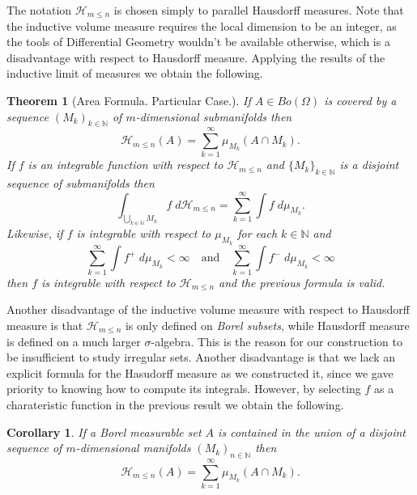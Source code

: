 \documentclass[%
 aip,
 amsmath,amssymb,
 reprint,%
jmp]{revtex4-2}
\newtheorem{theorem}{Theorem}[section]
\newtheorem{corollary}{Corollary}[section]
\begin{document}
The notation $\mathcal{H}_{m\leq n}$ is chosen simply to parallel Hausdorff measures. Note that the inductive volume measure requires the local dimension to be an integer, as the tools of Differential Geometry wouldn't be available otherwise, which is a disadvantage with respect to Hausdorff measure. Applying the results of the inductive limit of measures we obtain the following.

\begin{theorem}[Area Formula. Particular Case.]
If $A\in Bo(\Omega)$ is covered by a sequence $(M_{k})_{k\in\mathbb{N}}$ of $m$-dimensional submanifolds then
\begin{equation*}
    \mathcal{H}_{m\leq n}(A) = \sum_{k=1}^{\infty}\mu_{M_{k}}(A\cap M_{k}).
\end{equation*}
If $f$ is an integrable function with respect to $\mathcal{H}_{m\leq n}$ and $\{M_{k}\}_{k\in\mathbb{N}}$ is a disjoint sequence of submanifolds then
\begin{equation*}
    \int_{\bigcup\limits_{k\in\mathbb{N}}M_{k}} f\;d\mathcal{H}_{m\leq n} = \sum_{k=1}^{\infty}\int f\;d\mu_{M_{k}}.
\end{equation*}
Likewise, if $f$ is integrable with respect to $\mu_{M_{k}}$ for each $k\in\mathbb{N}$ and
\begin{equation*}
    \sum_{k=1}^{\infty}\int f^{+}\;d\mu_{M_{k}} < \infty \quad\text{and}\quad \sum_{k=1}^{\infty}\int f^{-}\;d\mu_{M_{k}} < \infty
\end{equation*}
then $f$ is integrable with respect to $\mathcal{H}_{m \leq n}$ and the previous formula is valid.
\end{theorem}

Another disadvantage of the inductive volume measure with respect to Hausdorff measure is that $\mathcal{H}_{m\leq n}$ is only defined on \textit{Borel subsets}, while Hausdorff measure is defined on a much larger $\sigma$-algebra. This is the reason for our construction to be insufficient to study irregular sets. Another disadvantage is that we lack an explicit formula for the Hasudorff measure as we constructed it, since we gave priority to knowing how to compute its integrals. However, by selecting $f$ as a charateristic function in the previous result we obtain the following.

\begin{corollary}
If a Borel measurable set $A$ is contained in the union of a disjoint sequence of $m$-dimensional manifolds $(M_{k})_{n\in\mathbb{N}}$ then
\begin{equation*}
    \mathcal{H}_{m\leq n}(A) = \sum_{k=1}^{\infty}\mu_{M_{k}}(A\cap M_{k}).
\end{equation*}
\end{corollary}
\end{document}
